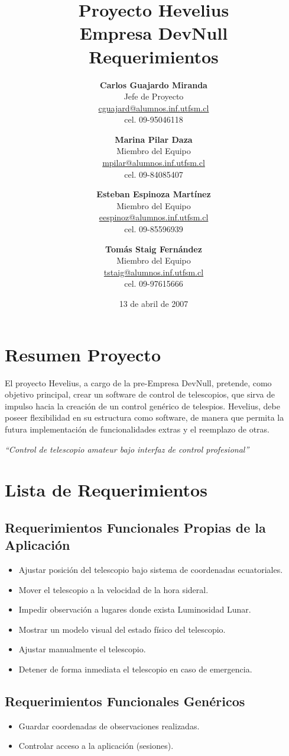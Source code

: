 \documentclass[letterpaper,spanish,10pt]{article}
\title{{\Huge \bf Proyecto Hevelius} \\ {\Large Empresa DevNull} \\ {\small Requerimientos}}
\author{
{\bf Carlos Guajardo Miranda} \\ Jefe de Proyecto \\ \url{cguajard@alumnos.inf.utfsm.cl} \\ cel. 09-95046118 
\and
{\bf Marina Pilar Daza} \\ Miembro del Equipo \\ \url{mpilar@alumnos.inf.utfsm.cl} \\ cel. 09-84085407
\and
{\bf Esteban Espinoza Mart\'inez} \\ Miembro del Equipo \\ \url{eespinoz@alumnos.inf.utfsm.cl} \\ cel. 09-85596939
\and
{\bf Tom\'as Staig Fern\'andez} \\ Miembro del Equipo \\ \url{tstaig@alumnos.inf.utfsm.cl} \\ cel. 09-97615666
}
\date{13 de abril de 2007}
\begin{document}
\maketitle


%
%
\newpage

\section{Resumen Proyecto}
El proyecto Hevelius, a cargo de la pre-Empresa DevNull, pretende, como objetivo principal, crear un software de control de telescopios, que sirva de impulso hacia la creaci\'on de un control gen\'erico de telespios. Hevelius, debe poseer flexibilidad en su estructura como software, de manera que permita la futura implementaci\'on de funcionalidades extras y el reemplazo de otras.

\begin{center}
\it{``Control de telescopio amateur bajo interfaz de control profesional''}
\end{center}


\section{Lista de Requerimientos}
\subsection{Requerimientos Funcionales Propias de la Aplicaci\'on}
\begin{itemize}
	\item Ajustar posici\'on del telescopio bajo sistema de coordenadas ecuatoriales.
	\item Mover el telescopio a la velocidad de la hora sideral.
	\item Impedir observaci\'on a lugares donde exista Luminosidad Lunar.
	\item Mostrar un modelo visual del estado f\'isico del telescopio.
	\item Ajustar manualmente el telescopio.
	\item Detener de forma inmediata el telescopio en caso de emergencia.
\end{itemize}


\subsection{Requerimientos Funcionales Gen\'ericos}
\begin{itemize}
	\item Guardar coordenadas de observaciones realizadas.
	\item Controlar acceso a la aplicaci\'on (sesiones).
\end{itemize}
\end{document}
